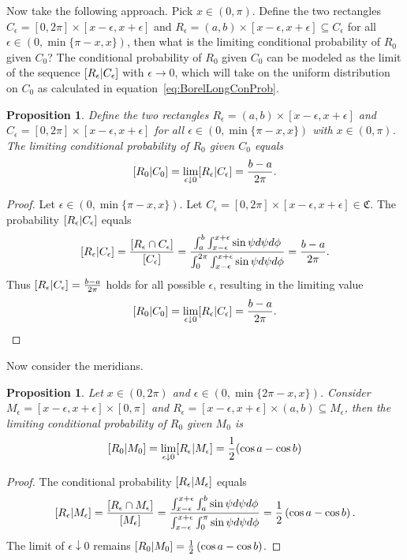 \documentclass[twoside,a4paper]{report}
\theoremstyle{plain}
\newtheorem{proposition}[theorem]{Proposition}
\theoremstyle{definition}
\theoremstyle{remark}
\numberwithin{equation}{chapter}
\let\P\relax
\DeclareMathOperator{\P}{\mathbb{P}}
\DeclareMathOperator{\1}{\mathbbm{1}}
\begin{document}
Now take the following approach. Pick $x\in(0,\pi)$. Define the two rectangles $C_\epsilon=[0,2\pi]\times[x-\epsilon,x+\epsilon]$ and $R_\epsilon=(a,b)\times[x-\epsilon,x+\epsilon]\subseteq C_\epsilon$ for all ${\epsilon\in(0,\min\{\pi-x,x\})}$, then what is the limiting conditional probability of $R_0$ given $C_0$? The conditional probability of $R_0$ given $C_0$ can be modeled as the limit of the sequence $\P[R_\epsilon|C_\epsilon]$ with $\epsilon\to0$, which will take on the uniform distribution on $C_0$ as calculated in equation~\eqref{eq:BorelLongConProb}.
\begin{proposition}
Define the two rectangles $R_\epsilon=(a,b)\times[x-\epsilon,x+\epsilon]$ and $C_\epsilon=[0,2\pi]\times[x-\epsilon,x+\epsilon]$ for all $\epsilon\in(0,\min\{\pi-x,x\})$ with $x\in(0,\pi)$. The limiting conditional probability of $R_0$ given $C_0$ equals
\begin{equation}
\P[R_0|C_0]=\lim_{\epsilon\downarrow0}\P[R_\epsilon|C_\epsilon]=\frac{b-a}{2\pi}.
\end{equation}
\end{proposition}
\begin{proof}
Let $\epsilon\in(0,\min\{\pi-x,x\})$. Let $C_\epsilon=[0,2\pi]\times[x-\epsilon,x+\epsilon]\in\mathfrak{C}$. The probability $\P[R_\epsilon|C_\epsilon]$ equals
\begin{equation}
\P[R_\epsilon|C_\epsilon]=\frac{\P[R_\epsilon\cap C_\epsilon]}{\P[C_\epsilon]}=\frac{\int_{a}^{b}\int_{x-\epsilon}^{x+\epsilon}\sin\psi d\psi d\phi}{\int_{0}^{2\pi}\int_{x-\epsilon}^{x+\epsilon}\sin\psi d\psi d\phi}=\frac{b-a}{2\pi}.
\end{equation}
Thus $\P[R_\epsilon|C_\epsilon]=\frac{b-a}{2\pi}$ holds for all possible $\epsilon$, resulting in the limiting value
\begin{equation}
\P[R_0|C_0]=\lim_{\epsilon\downarrow0}\P[R_\epsilon|C_\epsilon]=\frac{b-a}{2\pi}.
\end{equation}
\end{proof}

Now consider the meridians.
\begin{proposition}
Let $x\in(0,2\pi)$ and $\epsilon\in(0,\min\{2\pi-x,x\})$. Consider $M_\epsilon=[x-\epsilon,x+\epsilon]\times[0,\pi]$ and $R_\epsilon=[x-\epsilon,x+\epsilon]\times(a,b)\subseteq M_\epsilon$, then the limiting conditional probability of $R_0$ given $M_0$ is
\begin{equation}
\P[R_0|M_0]=\lim_{\epsilon\downarrow0}\P[R_\epsilon|M_\epsilon]=\frac{1}{2}(\cos a-\cos b)
\end{equation}
\end{proposition}
\begin{proof}
The conditional probability $\P[R_\epsilon|M_\epsilon]$ equals
\begin{equation}
\P[R_\epsilon|M_\epsilon]=\frac{\P[R_\epsilon\cap M_\epsilon]}{\P[M_\epsilon]}=\frac{\int_{x-\epsilon}^{x+\epsilon}\int_a^b\sin\psi d\psi d\phi}{\int_{x-\epsilon}^{x+\epsilon}\int_0^{\pi}\sin\psi d\psi d\phi}=\frac{1}{2}\left(\cos a-\cos b\right).
\end{equation}
The limit of $\epsilon\downarrow0$ remains $\P[R_0|M_0]=\frac{1}{2}\left(\cos a-\cos b\right)$.
\end{proof}
\end{document}
